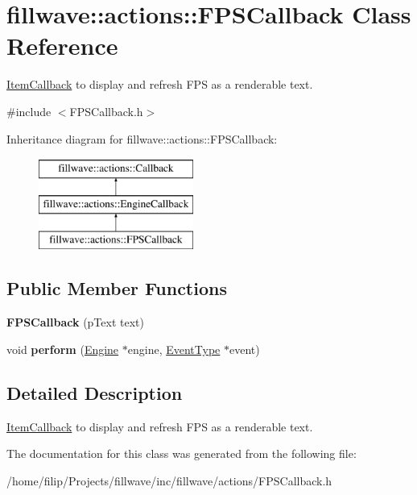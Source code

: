 \hypertarget{classfillwave_1_1actions_1_1FPSCallback}{}\section{fillwave\+:\+:actions\+:\+:F\+P\+S\+Callback Class Reference}
\label{classfillwave_1_1actions_1_1FPSCallback}


\hyperlink{classfillwave_1_1actions_1_1ItemCallback}{Item\+Callback} to display and refresh F\+P\+S as a renderable text.  




{\ttfamily \#include $<$F\+P\+S\+Callback.\+h$>$}

Inheritance diagram for fillwave\+:\+:actions\+:\+:F\+P\+S\+Callback\+:\begin{figure}[H]
\begin{center}
\leavevmode
\includegraphics[height=3.000000cm]{classfillwave_1_1actions_1_1FPSCallback}
\end{center}
\end{figure}
\subsection*{Public Member Functions}
\begin{DoxyCompactItemize}
\item 
\hypertarget{classfillwave_1_1actions_1_1FPSCallback_a87075ddb053a3dc0485fc6571e7782bc}{}{\bfseries F\+P\+S\+Callback} (p\+Text text)\label{classfillwave_1_1actions_1_1FPSCallback_a87075ddb053a3dc0485fc6571e7782bc}

\item 
\hypertarget{classfillwave_1_1actions_1_1FPSCallback_a85cd3c5affa2850c49f017a1a070faeb}{}void {\bfseries perform} (\hyperlink{classfillwave_1_1Engine}{Engine} $\ast$engine, \hyperlink{classfillwave_1_1actions_1_1EventType}{Event\+Type} $\ast$event)\label{classfillwave_1_1actions_1_1FPSCallback_a85cd3c5affa2850c49f017a1a070faeb}

\end{DoxyCompactItemize}


\subsection{Detailed Description}
\hyperlink{classfillwave_1_1actions_1_1ItemCallback}{Item\+Callback} to display and refresh F\+P\+S as a renderable text. 

The documentation for this class was generated from the following file\+:\begin{DoxyCompactItemize}
\item 
/home/filip/\+Projects/fillwave/inc/fillwave/actions/F\+P\+S\+Callback.\+h\end{DoxyCompactItemize}
